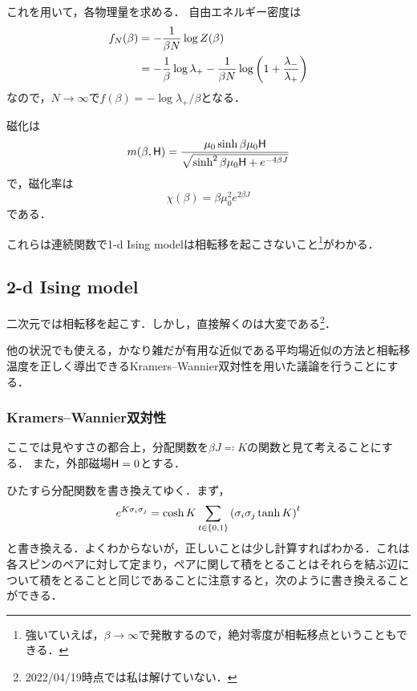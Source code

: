 	これを用いて，各物理量を求める．
	自由エネルギー密度は
	\begin{align}
			f_N(\beta) &= -\frac{1}{\beta N}\log Z(\beta)\\
					   &= -\frac{1}{\beta}\log\lambda_{+} - \frac{1}{\beta N}\log\qty(1 + \frac{\lambda_{-}}{\lambda_{+}})
	\end{align}
	なので，$N\to \infty$で$f(\beta ) = -\log\lambda_{+}/\beta$となる．

	磁化は
	\begin{equation}
			m(\beta, \mathsf{H}) = \frac{\mu_0\sinh\beta\mu_0\mathsf{H}}{\sqrt{\sinh^2\beta\mu_0\mathsf{H} + e^{-4\beta J}}}
	\end{equation}
	で，磁化率は
	\begin{equation}
			\chi(\beta) = \beta \mu_0^2e^{2\beta J}
	\end{equation}
	である．

	これらは連続関数で1-d Ising modelは相転移を起こさないこと\footnote{強いていえば，$\beta\to\infty$で発散するので，絶対零度が相転移点ということもできる． }がわかる．

	\subsection{2-d Ising model}
	二次元では相転移を起こす．しかし，直接解くのは大変である\footnote{2022/04/19時点では私は解けていない．}．

	他の状況でも使える，かなり雑だが有用な近似である平均場近似の方法と相転移温度を正しく導出できるKramers--Wannier双対性を用いた議論を行うことにする．

	\subsubsection{Kramers--Wannier双対性}
	ここでは見やすさの都合上，分配関数を$\beta J \eqqcolon K$の関数と見て考えることにする．
	また，外部磁場$\mathsf{H} = 0$とする．

	ひたすら分配関数を書き換えてゆく．まず，
	\begin{equation}
			e^{K\sigma_i \sigma_j} = \cosh K \sum_{t\in\qty{0, 1}}\qty(\sigma_i \sigma_j \tanh K)^t
	\end{equation}
	と書き換える．よくわからないが，正しいことは少し計算すればわかる．これは各スピンのペアに対して定まり，ペアに関して積をとることはそれらを結ぶ辺について積をとることと同じであることに注意すると，次のように書き換えることができる．

